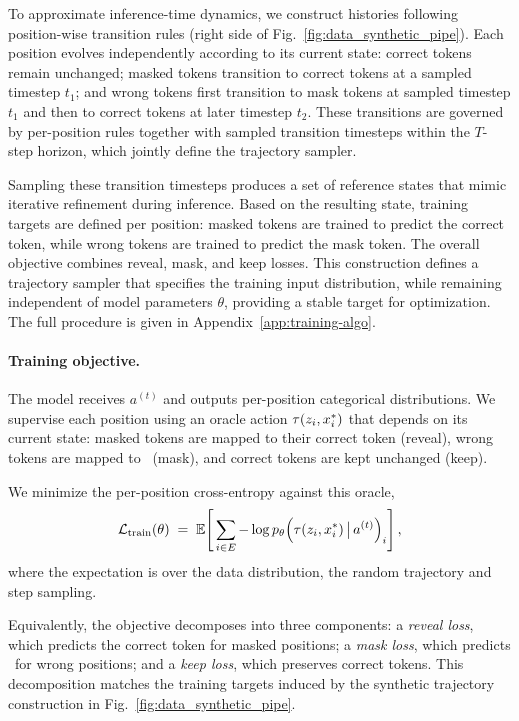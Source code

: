 To approximate inference-time dynamics, we construct histories following position-wise transition rules (right side of Fig.~\ref{fig:data_synthetic_pipe}). Each position evolves independently according to its current state: correct tokens remain unchanged; masked tokens transition to correct tokens at a sampled timestep $t_1$; and wrong tokens first transition to mask tokens at sampled timestep $t_1$ and then to correct tokens at later timestep $t_2$. These transitions are governed by per-position rules together with sampled transition timesteps within the $T$-step horizon, which jointly define the trajectory sampler.

Sampling these transition timesteps produces a set of reference states that mimic iterative refinement during inference. Based on the resulting state, training targets are defined per position: masked tokens are trained to predict the correct token, while wrong tokens are trained to predict the mask token. The overall objective combines reveal, mask, and keep losses. This construction defines a trajectory sampler that specifies the training input distribution, while remaining independent of model parameters $\theta$, providing a stable target for optimization. The full procedure is given in Appendix~\ref{app:training-algo}.

\paragraph{Training objective.}
The model receives $a^{(t)}$ and outputs per-position categorical distributions. We supervise each position using an oracle action $\tau(z_i, x^{\ast}_i)$ that depends on its current state: masked tokens are mapped to their correct token (reveal), wrong tokens are mapped to \mask\ (mask), and correct tokens are kept unchanged (keep).

We minimize the per-position cross-entropy against this oracle,
\begin{equation}
\mathcal{L}_{\mathrm{train}}(\theta) \;=\; \mathbb{E}\!\left[\,\sum_{i \in E} -\log p_\theta\!\left(\tau(z_i, x^{\ast}_i) \,\big|\, a^{(t)}\right)_i\right],
\label{eq:total-loss}
\end{equation}
where the expectation is over the data distribution, the random trajectory and step sampling.

Equivalently, the objective decomposes into three components:
a \textit{reveal loss}, which predicts the correct token for masked positions;
a \textit{mask loss}, which predicts \mask\ for wrong positions;
and a \textit{keep loss}, which preserves correct tokens.
This decomposition matches the training targets induced by the synthetic trajectory construction in Fig.~\ref{fig:data_synthetic_pipe}.

